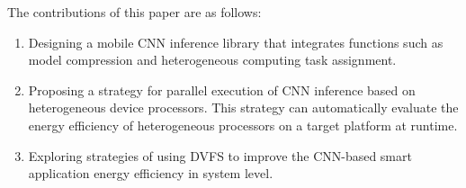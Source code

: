 \begin{enabstract}
The contributions of this paper are as follows:

\begin{enumerate}
  \item Designing a mobile CNN inference library that integrates functions such as model compression and heterogeneous computing task assignment.
  \item Proposing a strategy for parallel execution of CNN inference based on heterogeneous device processors. This strategy can automatically evaluate the energy efficiency of heterogeneous processors on a target platform at runtime.
  \item Exploring strategies of using DVFS to improve the CNN-based smart application energy efficiency in system level.
\end{enumerate}

\end{enabstract}